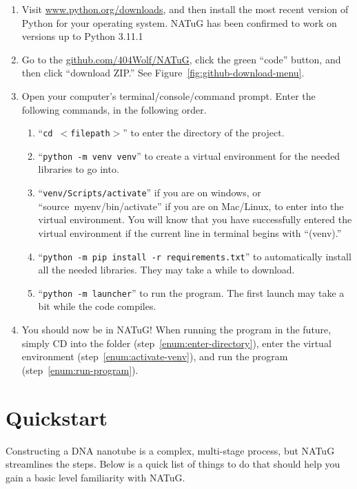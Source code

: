 \documentclass[titlepage]{article}
\begin{document}
	\begin{enumerate} \label{sect:getting-natug-running}
		\item Visit \href{Python's download page}{www.python.org/downloads}, and then install the most recent version of Python for your operating system. NATuG has been confirmed to work on versions up to Python 3.11.1
		\item Go to the \href{NATuG’s Github page}{github.com/404Wolf/NATuG}, click the green ``code'' button, and then click ``download ZIP.'' See Figure~\ref{fig:github-download-menu}.
		\item Open your computer's terminal/console/command prompt. Enter the following commands, in the following order. 
		
		\begin{enumerate}
			\item ``\texttt{cd $<$filepath$>$}'' to enter the directory of the project. \label{enum:enter-directory}
			\item ``\texttt{python~-m~venv~venv}'' to create a virtual environment for the needed libraries to go into.
			\item ``\texttt{venv/Scripts/activate}'' if you are on windows, or ``source~myenv/bin/activate'' if you are on Mac/Linux, to enter into the virtual environment. You will know that you have successfully entered the virtual environment if the current line in terminal begins with ``(venv).'' \label{enum:activate-venv}
			\item ``\texttt{python -m pip install -r requirements.txt}'' to automatically install all the needed libraries. They may take a while to download.
			\item ``\texttt{python -m launcher}'' to run the program. The first launch may take a bit while the code compiles. \label{enum:run-program}
		\end{enumerate}
	
		\item You should now be in NATuG! When running the program in the future, simply CD into the folder (step~\ref{enum:enter-directory}), enter the virtual environment (step~\ref{enum:activate-venv}), and run the program (step~\ref{enum:run-program}).
	\end{enumerate}

\section{Quickstart}

Constructing a DNA nanotube is a complex, multi-stage process, but NATuG streamlines the steps. Below is a quick list of things to do that should help you gain a basic level familiarity with NATuG.
\end{document}
